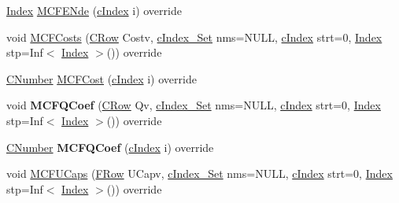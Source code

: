\begin{DoxyCompactItemize}
\item 
\mbox{\hyperlink{class_m_c_f_class_ad53d6229d7ec28555a9c9c2fd9abf773}{Index}} \mbox{\hyperlink{class_m_c_f_cplex_a9518f17ab7de191eb4f4b2c6be528344}{M\+C\+F\+E\+Nde}} (\mbox{\hyperlink{class_m_c_f_class_a76aaabb20535c51a2752b93f6c38fe54}{c\+Index}} i) override
\item 
void \mbox{\hyperlink{class_m_c_f_cplex_a1a7da972e0e55e14fe9459fd5cd7d374}{M\+C\+F\+Costs}} (\mbox{\hyperlink{class_m_c_f_class_a62409402be4e4b301e1a568f99f877be}{C\+Row}} Costv, \mbox{\hyperlink{class_m_c_f_class_a81575b2d4e4d5636b17170432150ae69}{c\+Index\+\_\+\+Set}} nms=N\+U\+LL, \mbox{\hyperlink{class_m_c_f_class_a76aaabb20535c51a2752b93f6c38fe54}{c\+Index}} strt=0, \mbox{\hyperlink{class_m_c_f_class_ad53d6229d7ec28555a9c9c2fd9abf773}{Index}} stp=Inf$<$ \mbox{\hyperlink{class_m_c_f_class_ad53d6229d7ec28555a9c9c2fd9abf773}{Index}} $>$()) override
\item 
\mbox{\hyperlink{class_m_c_f_class_a24d0627ba8213afe1ec4ebeb4508e8f1}{C\+Number}} \mbox{\hyperlink{class_m_c_f_cplex_a929a5d13c65f3e297d2f8aef321aaab3}{M\+C\+F\+Cost}} (\mbox{\hyperlink{class_m_c_f_class_a76aaabb20535c51a2752b93f6c38fe54}{c\+Index}} i) override
\item 
\mbox{\label{class_m_c_f_cplex_afda1b4424afc83c9fb8209c1fc164265}} 
void {\bfseries M\+C\+F\+Q\+Coef} (\mbox{\hyperlink{class_m_c_f_class_a62409402be4e4b301e1a568f99f877be}{C\+Row}} Qv, \mbox{\hyperlink{class_m_c_f_class_a81575b2d4e4d5636b17170432150ae69}{c\+Index\+\_\+\+Set}} nms=N\+U\+LL, \mbox{\hyperlink{class_m_c_f_class_a76aaabb20535c51a2752b93f6c38fe54}{c\+Index}} strt=0, \mbox{\hyperlink{class_m_c_f_class_ad53d6229d7ec28555a9c9c2fd9abf773}{Index}} stp=Inf$<$ \mbox{\hyperlink{class_m_c_f_class_ad53d6229d7ec28555a9c9c2fd9abf773}{Index}} $>$()) override
\item 
\mbox{\label{class_m_c_f_cplex_a0e4fac647aafbd9bdf5cefbfe9b8fb12}} 
\mbox{\hyperlink{class_m_c_f_class_a24d0627ba8213afe1ec4ebeb4508e8f1}{C\+Number}} {\bfseries M\+C\+F\+Q\+Coef} (\mbox{\hyperlink{class_m_c_f_class_a76aaabb20535c51a2752b93f6c38fe54}{c\+Index}} i) override
\item 
void \mbox{\hyperlink{class_m_c_f_cplex_aa5d64c820aa5952a8cd80d4a89eb334a}{M\+C\+F\+U\+Caps}} (\mbox{\hyperlink{class_m_c_f_class_a9dae1f1a39c208ce3c2b337cd5bb3d00}{F\+Row}} U\+Capv, \mbox{\hyperlink{class_m_c_f_class_a81575b2d4e4d5636b17170432150ae69}{c\+Index\+\_\+\+Set}} nms=N\+U\+LL, \mbox{\hyperlink{class_m_c_f_class_a76aaabb20535c51a2752b93f6c38fe54}{c\+Index}} strt=0, \mbox{\hyperlink{class_m_c_f_class_ad53d6229d7ec28555a9c9c2fd9abf773}{Index}} stp=Inf$<$ \mbox{\hyperlink{class_m_c_f_class_ad53d6229d7ec28555a9c9c2fd9abf773}{Index}} $>$()) override

\end{DoxyCompactItemize}
